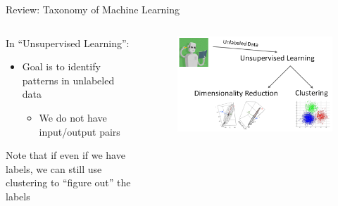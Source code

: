 \documentclass[aspectratio=169]{../latex_main/tntbeamer}  %
\begin{document}
	
	\begin{frame}{Review: Taxonomy of Machine Learning}
	    \begin{columns}
	        \begin{column}{.5\textwidth}
	            In “Unsupervised Learning”:
	                \begin{itemize}
	                    \item Goal is to identify patterns in unlabeled data
	                    \begin{itemize}
	                        \item We do not have input/output pairs
	                    \end{itemize}
	                \end{itemize}
	                Note that if even if we have labels, we can still use clustering to “figure out” the labels
	        \end{column}
	        
	        
	        \begin{column}{.5\textwidth}
	                \begin{figure}
	                    \centering
	                    \includegraphics[scale=.35]{Bild2}
	                \end{figure}
	        \end{column}
	    \end{columns}
	\end{frame}
	
	
	
\end{document}
